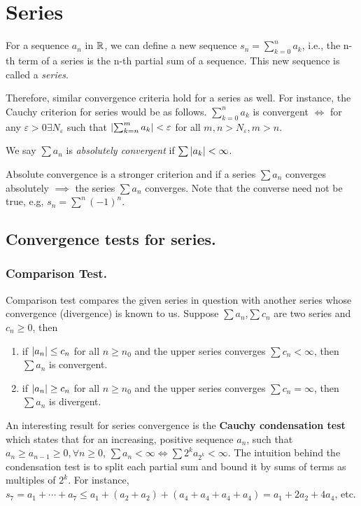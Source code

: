 \section{Series}
For a sequence $a_n$ in $\mathbb{R}$, we can define a new sequence $s_n = \sum^n_{k=0} a_k$, i.e., the n-th term of a series is the n-th partial sum of a sequence.
This new sequence is called a \textit{series}.

Therefore, similar convergence criteria hold for a series as well.
For instance, the Cauchy criterion for series would be as follows.
$\sum^n_{k=0} a_k$ is convergent $\iff$ for any $\varepsilon>0\exists N_\varepsilon$ such that $\left\lvert\sum^m_{k=n} a_k\right\rvert<\varepsilon$ for all $m,n>N_\varepsilon, m>n$.
\begin{definition}
We say $\sum a_n$ is \textit{absolutely convergent} if $\sum \left\lvert a_k\right\rvert<\infty$.
\end{definition}
Absolute convergence is a stronger criterion and if a series $\sum a_n$ converges absolutely $\implies$ the series $\sum a_n$ converges.
Note that the converse need not be true, e.g, $s_n=\sum^n (-1)^n$.

\subsection{Convergence tests for series.}
\subsubsection{Comparison Test.}
Comparison test compares the given series in question with another series whose convergence (divergence) is known to us.
Suppose $\sum a_n$,$\sum c_n$ are two series and $c_n\geq  0$, then
\begin{enumerate}[label=(\alph*)]
    \item if $\left\lvert a_n\right\rvert\leq c_n$ for all $n\geq n_0$ and the upper series converges $\sum c_n< \infty$, then $\sum a_n$ is convergent.
    \item if $\left\lvert a_n\right\rvert\geq c_n$ for all $n\geq n_0$ and the upper series converges $\sum c_n = \infty$, then $\sum a_n$ is divergent.
\end{enumerate}

An interesting result for series convergence is the \textbf{Cauchy condensation test} which states that for an increasing, positive sequence $a_n$, such that $a_n\geq a_{n-1}\geq0, \forall n\geq 0$, $\sum a_n<\infty \iff \sum 2^k a_{2^k}< \infty$.
The intuition behind the condensation test is to split each partial sum and bound it by sums of terms as multiples of $2^k$. For instance, $s_7 = a_1+\cdots+a_7\leq a_1 + (a_2 + a_2) + (a_4+a_4+a_4+a_4)=a_1 + 2a_2 + 4a_4$, etc.

